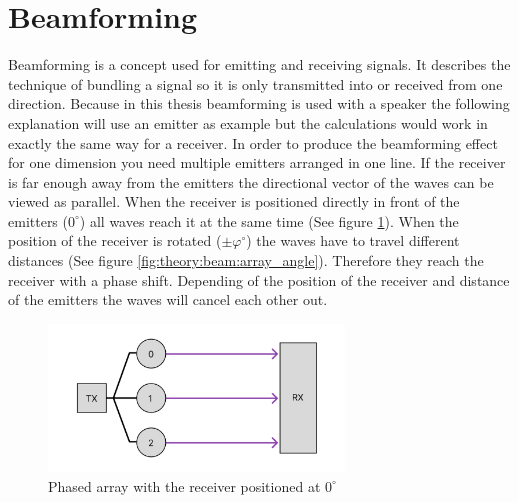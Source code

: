 \section{Beamforming}\label{sec:theory:beam}


Beamforming is a concept used for emitting and receiving signals. It describes the technique of bundling a signal so it is only transmitted into or received from one direction. Because in this thesis beamforming is used with a speaker the following explanation will use an emitter as example but the calculations would work in exactly the same way for a receiver.\cite{van_veen_beamforming_1988}\p
%
In order to produce the beamforming effect for one dimension you need multiple emitters arranged in one line.
If the receiver is far enough away from the emitters the directional vector of the waves can be viewed as parallel. When the receiver is positioned directly in front of the emitters (\(0^\circ\)) all waves reach it at the same time (See figure \ref{fig:theory:beam:array_straight}).
When the position of the receiver is rotated (\(\pm \varphi^\circ\)) the waves have to travel different distances (See figure \ref{fig:theory:beam:array_angle}). Therefore they reach the receiver with a phase shift. Depending of the position of the receiver and distance of the emitters the waves will cancel each other out.
%
\begin{figure}
  \centering
  \includegraphics[width=0.7\textwidth]{src/assets/pictures/theory/straight_array.png}
  \caption{Phased array with the receiver positioned at $0^\circ$}\label{fig:theory:beam:array_straight}
\end{figure}
